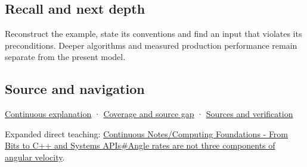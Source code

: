 \subsection{Recall and next depth}\label{recall-and-next-depth}

Reconstruct the example, state its conventions and find an input that violates its preconditions. Deeper algorithms and measured production performance remain separate from the present model.

\subsection{Source and navigation}\label{source-and-navigation}

\href{Continuous\%20Notes/Computing\%20Foundations\%20-\%20From\%20Bits\%20to\%20C++\%20and\%20Systems\%20APIs\#Keep\%20the\%20promises\%20visible\%20while\%20moving\%20between\%20representations}{Continuous explanation} · \hyperref[appendix-fd090d982a15]{Coverage and source gap} · \hyperref[appendix-a103e7846d21]{Sources and verification}

Expanded direct teaching: \href{Continuous\%20Notes/Computing\%20Foundations\%20-\%20From\%20Bits\%20to\%20C++\%20and\%20Systems\%20APIs\#Angle\%20rates\%20are\%20not\%20three\%20components\%20of\%20angular\%20velocity}{Continuous Notes/Computing Foundations - From Bits to C++ and Systems APIs\#Angle rates are not three components of angular velocity}.
